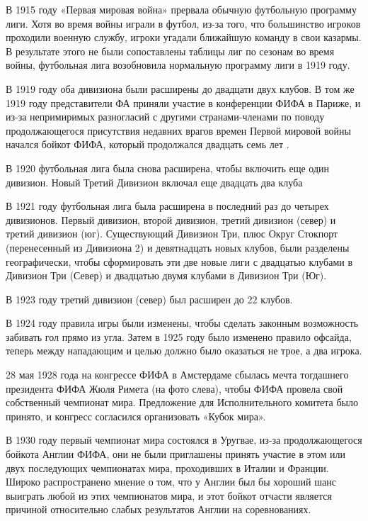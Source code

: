 В 1915 году «Первая мировая война» прервала обычную футбольную программу лиги. Хотя во время войны играли в футбол, из-за того, что большинство игроков проходили военную службу, игроки угадали ближайшую команду в свои казармы. В результате этого не были сопоставлены таблицы лиг по сезонам во время войны, футбольная лига возобновила нормальную программу лиги в 1919 году.

В 1919 году оба дивизиона были расширены до двадцати двух клубов. В том же 1919 году представители ФА приняли участие в конференции ФИФА в Париже, и из-за непримиримых разногласий с другими странами-членами по поводу продолжающегося присутствия недавних врагов времен Первой мировой войны начался бойкот ФИФА, который продолжался двадцать семь лет .

В 1920 футбольная лига была снова расширена, чтобы включить еще один дивизион. Новый Третий Дивизион включал еще двадцать два клуба

В 1921 году футбольная лига была расширена в последний раз до четырех дивизионов.  Первый дивизион, второй дивизион, третий дивизион (север) и третий дивизион (юг). Существующий Дивизион Три, плюс Округ Стокпорт (перенесенный из Дивизиона 2) и девятнадцать новых клубов, были разделены географически, чтобы сформировать эти две новые лиги с двадцатью клубами в Дивизион Три (Север) и двадцатью двумя клубами в Дивизион Три (Юг).

В 1923 году третий дивизион (север) был расширен до 22 клубов.

В 1924 году правила игры были изменены, чтобы сделать законным возможность забивать гол прямо из угла. Затем в 1925 году было изменено правило офсайда, теперь между нападающим и целью должно было оказаться не трое, а два игрока. 

28 мая 1928 года на конгрессе ФИФА в Амстердаме сбылась мечта тогдашнего президента ФИФА Жюля Римета (на фото слева), чтобы ФИФА провела свой собственный чемпионат мира. Предложение для Исполнительного комитета было принято, и конгресс согласился организовать «Кубок мира».

В 1930 году первый чемпионат мира состоялся в Уругвае, из-за продолжающегося бойкота Англии ФИФА, они не были приглашены принять участие в этом или двух последующих чемпионатах мира, проходивших в Италии и Франции. Широко распространено мнение о том, что у Англии был бы хороший шанс выиграть любой из этих чемпионатов мира, и этот бойкот отчасти является причиной относительно слабых результатов Англии на соревнованиях.

